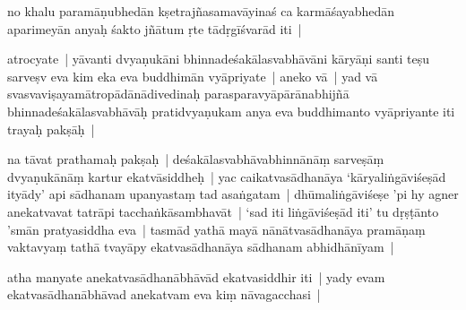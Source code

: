 \documentclass[article,a4paper]{memoir}
\newcommand{\gap}[1]{}
\begin{document}
	  \pstart no khalu paramā\-ṇubhedā\-n kṣetrajñasamavā\-yinaś ca karmā\-śayabhedā\-n aparimeyā\-n anyaḥ śakto jñā\-tum ṛte tā\-dṛgī\-śvarā\-d\label{ratnakīrtinibandhāvali__36r1NJ1HHMVH5RR7U2GTVWCF63V} iti |
	\pend
      

	  \pstart atrocyate | yā\-vanti dvyaṇukā\-ni bhinnadeśakā\-lasvabhā\-vā\-ni kā\-ryā\-ṇi santi teṣu sarveṣv eva kim eka eva buddhimā\-n vyā\-priyate | aneko vā\- | yad vā\- svasvaviṣayamā\-tropā\-dā\-nā\-divedinaḥ parasparavyā\-pā\-rā\-nabhijñā\- bhinnadeśakā\-lasvabhā\-vā\-ḥ pratidvyaṇukam anya eva buddhimanto vyā\-priyante iti trayaḥ pakṣā\-ḥ |
	\pend
      

	  \pstart na tā\-vat \label{ratnakīrtinibandhāvali__36r1NM7W6RLH3UQ01ZEG4Q53FWC}prathamaḥ pakṣaḥ |\label{ratnakīrtinibandhāvali__36r1NM7W6SG03AESJNSHQ1FK1L5} de\gap{}śakā\-lasvabhā\-vabhinnā\-nā\-ṃ sarveṣā\-ṃ dvyaṇukā\-nā\-ṃ kartur ekatvā\-siddheḥ | yac caikatvasā\-dhanā\-ya ‘kā\-ryaliṅgā\-viśeṣā\-d ityā\-dy’ api sā\-dhanam upanyastaṃ tad asaṅgatam | dhū\-maliṅgā\-viśeṣe 'pi hy agner anekatvavat tatrā\-pi tacchaṅkā\-sambhavā\-t | ‘\label{ratnakīrtinibandhāvali__36r1NSAWNTV0PU093F550ENXSD2}sad iti liṅgā\-viśeṣā\-d\label{ratnakīrtinibandhāvali__36r1NSAWNTWQ48AKDPN5RIVJIC3} iti’ tu dṛṣṭā\-nto 'smā\-n pratyasiddha eva | tasmā\-d yathā\- mayā\- nā\-nā\-tvasā\-dhanā\-ya pramā\-ṇaṃ vaktavyaṃ tathā\- tvayā\-py ekatvasā\-dhanā\-ya sā\-dhanam abhidhā\-nī\-yam |
	\pend
      

	  \pstart atha manyate anekatvasā\-dhanā\-bhā\-vā\-d ekatvasiddhir iti | yady evam ekatvasā\-dhanā\-bhā\-vad anekatvam eva kiṃ nā\-vagacchasi |
	\pend
      
\end{document}
